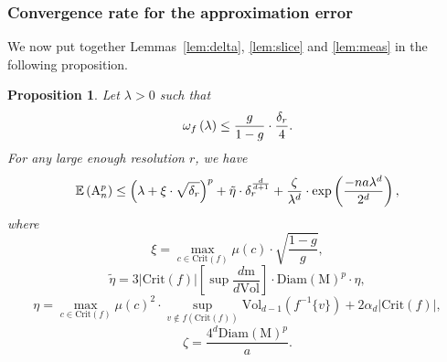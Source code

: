 \documentclass[pdflatex,sn-mathphys-ay]{sn-jnl}%
\newtheorem{proposition}{Proposition}[section]
\newcommand{\man}{\mathrm{M}}
\newcommand{\mes}{\mathrm{m}}
\newcommand{\critic}{{\mathrm {Crit}}}
\newcommand{\appr}{{\mathrm {A}}}
\newcommand{\haus}{{\mathrm {d_H}}}
\newcommand{\diam}{\mathrm{Diam}}
\newcommand{\vol}{\mathrm{Vol}}
\newcommand{\coverwidth}{\change{\delta_r}}
\newcommand{\change}[1]{\noindent #1}
\theoremstyle{thmstyleone}%
\begin{document}
\subsubsection{Convergence rate for the approximation error}

 
We now put together Lemmas~\ref{lem:delta}, \ref{lem:slice} and \ref{lem:meas} in the following proposition.

 

\begin{proposition}\label{prop:apprx}
Let $\lambda>0$ such that
$$\omega_f\left(\lambda\right)\leq\frac{g}{1-g}\cdot\frac{\coverwidth}{4}.$$
For any large enough resolution $r$, we have
$$\mathbb{E}\left(\appr_n^p\right)\leq \left(\lambda+\xi\cdot\sqrt{\coverwidth}\right)^p
    +\tilde{\eta}\cdot\coverwidth^{\frac{d}{d+1}}+\frac{\zeta}{\lambda^d}\cdot\exp\left(\frac{-na\lambda^d}{2^d}\right),$$
    where
    $$\xi=\max_{c\in\critic(f)}\mu(c)\cdot\sqrt{\frac{1-g}{g}},$$
    $$\tilde{\eta}=3 |\critic(f)| \left[\sup\frac{d\mes}{d\vol}\right]\cdot\diam(\man)^p\cdot\eta,$$
    $$\eta=\max_{c\in\critic(f)}\mu(c)^2\cdot\sup_{v\notin f(\critic(f))}\vol_{d-1}\left(f^{-1}\{v\}\right)+2\alpha_d\left|\critic(f)\right|,$$
    $$\zeta=\frac{4^d\diam(\man)^p}{a}.$$

\end{proposition}
\end{document}
